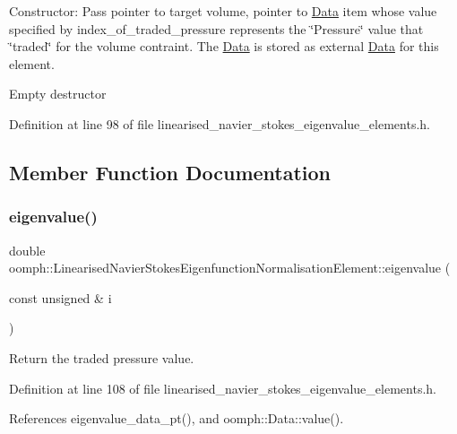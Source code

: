 Constructor\+: Pass pointer to target volume, pointer to \hyperlink{classoomph_1_1Data}{Data} item whose value specified by index\+\_\+of\+\_\+traded\+\_\+pressure represents the \char`\"{}\+Pressure\char`\"{} value that \char`\"{}traded\char`\"{} for the volume contraint. The \hyperlink{classoomph_1_1Data}{Data} is stored as external \hyperlink{classoomph_1_1Data}{Data} for this element. 

Empty destructor 

Definition at line 98 of file linearised\+\_\+navier\+\_\+stokes\+\_\+eigenvalue\+\_\+elements.\+h.



\subsection{Member Function Documentation}
\mbox{\label{classoomph_1_1LinearisedNavierStokesEigenfunctionNormalisationElement_a6813414a2848d332d50029de27b30d01}} 
\subsubsection{\texorpdfstring{eigenvalue()}{eigenvalue()}}
{\footnotesize\ttfamily double oomph\+::\+Linearised\+Navier\+Stokes\+Eigenfunction\+Normalisation\+Element\+::eigenvalue (\begin{DoxyParamCaption}\item[{const unsigned \&}]{i }\end{DoxyParamCaption})\hspace{0.3cm}{\ttfamily [inline]}}



Return the traded pressure value. 



Definition at line 108 of file linearised\+\_\+navier\+\_\+stokes\+\_\+eigenvalue\+\_\+elements.\+h.



References eigenvalue\+\_\+data\+\_\+pt(), and oomph\+::\+Data\+::value().



